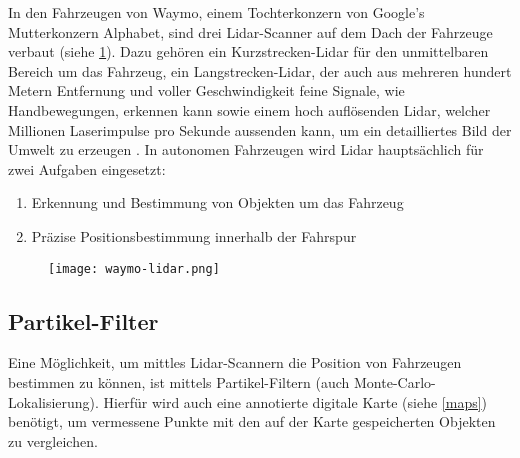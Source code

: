 In den Fahrzeugen von Waymo, einem Tochterkonzern von Google's Mutterkonzern Alphabet, sind drei \acs{Lidar}-Scanner auf dem Dach der Fahrzeuge verbaut (siehe \ref{waymo-lidar}). Dazu gehören ein Kurzstrecken-\acs{Lidar} für den unmittelbaren Bereich um das Fahrzeug, ein Langstrecken-\acs{Lidar}, der auch aus mehreren hundert Metern Entfernung und voller Geschwindigkeit feine Signale, wie Handbewegungen, erkennen kann sowie einem hoch auflösenden \acs{Lidar}, welcher Millionen Laserimpulse pro Sekunde aussenden kann, um ein detailliertes Bild der Umwelt zu erzeugen . In autonomen Fahrzeugen wird \acs{Lidar} hauptsächlich für zwei Aufgaben eingesetzt:
\begin{enumerate}
  \item{Erkennung und Bestimmung von Objekten um das Fahrzeug}
  \item{Präzise Positionsbestimmung innerhalb der Fahrspur}
\end{enumerate}

\begin{figure}\centering
  \texttt{[image: waymo-lidar.png]}
  \label{waymo-lidar}
\end{figure}

\subsection{Partikel-Filter}

Eine Möglichkeit, um mittles \acs{Lidar}-Scannern die Position von Fahrzeugen bestimmen zu können, ist mittels Partikel-Filtern (auch Monte-Carlo-Lokalisierung). Hierfür wird auch eine annotierte digitale Karte (siehe \ref{maps}) benötigt, um vermessene Punkte mit den auf der Karte gespeicherten Objekten zu vergleichen.

